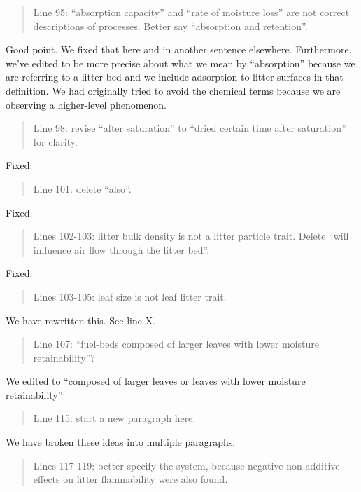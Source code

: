 \documentclass[letterpaper, 12pt]{letter}
\begin{document}
\begin{letter}{}
\begin{quote}
Line 95: “absorption capacity” and “rate of moisture loss” are not correct descriptions of processes. Better say “absorption and retention”.
\end{quote}

Good point. We fixed that here and in another sentence elsewhere. Furthermore, we've edited to be more precise about what we mean by ``absorption'' because we are referring to a litter bed and we include adsorption to litter surfaces in that definition. We had originally tried to avoid the chemical terms because we are observing a higher-level phenomenon.

\begin{quote}
Line 98: revise “after saturation” to “dried certain time after saturation” for clarity.
\end{quote}

Fixed.

\begin{quote}
Line 101: delete “also”.
\end{quote}

Fixed.

\begin{quote}
Lines 102-103: litter bulk density is not a litter particle trait. Delete “will influence air flow through the litter bed”.
\end{quote}

Fixed.

\begin{quote}
Lines 103-105: leaf size is not leaf litter trait.
\end{quote}

We have rewritten this. See line X.

\begin{quote}
Line 107: “fuel-beds composed of larger leaves with lower moisture retainability”?
\end{quote}

We edited to ``composed of larger leaves or leaves with lower moisture retainability''

\begin{quote}
Line 115: start a new paragraph here.
\end{quote}

We have broken these ideas into multiple paragraphs.

\begin{quote}
Lines 117-119: better specify the system, because negative non-additive effects on litter
flammability were also found.
\end{quote}


\end{letter}
\end{document}
